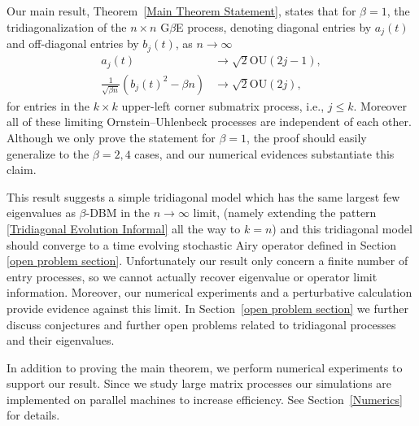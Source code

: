 \documentclass{amsart}
\numberwithin{equation}{section}
\newcommand{\sung}[2][]{\todo[color=green, #1]{\textbf{Sungwoo}: #2}}
\begin{document}
Our main result, Theorem~\ref{Main Theorem Statement}, states that for $\beta=1$, the tridiagonalization of the $n\times n$ G$\beta$E process, denoting diagonal entries by $a_j(t)$ and off-diagonal entries by $b_j(t)$, as $n\to\infty$
\begin{align*}
    a_j(t) &\to \sqrt{2}\mathrm{OU}(2j-1),\\
    \frac{1}{\sqrt{\beta n}}(b_j(t)^2 - \beta n) &\to \sqrt{2}\mathrm{OU}(2j),
\end{align*}
for entries in the $k \times k$ upper-left corner submatrix process, i.e., $j\leq k$. Moreover all of these limiting Ornstein--Uhlenbeck processes are independent of each other. Although we only prove the statement for $\beta=1$, the proof should easily generalize to the $\beta = 2,4$ cases, and our numerical evidences substantiate this claim.  

This result suggests a simple tridiagonal model which has the same largest few eigenvalues as $\beta$-DBM in the $n \to \infty$ limit, (namely extending the pattern \eqref{Tridiagonal Evolution Informal} all the way to $k=n$) and this tridiagonal model should converge to a time evolving stochastic Airy operator defined in Section \ref{open problem section}. Unfortunately our result only concern a finite number of entry processes, so we cannot actually recover eigenvalue or operator limit information. Moreover, our numerical experiments and a perturbative calculation provide evidence against this limit. In Section~\ref{open problem section} we further discuss conjectures and further open problems related to tridiagonal processes and their eigenvalues. 

In addition to proving the main theorem, we perform numerical experiments to support our result. Since we study large matrix processes our simulations are implemented on parallel machines to increase efficiency. See Section~\ref{Numerics} for details.

\end{document}

